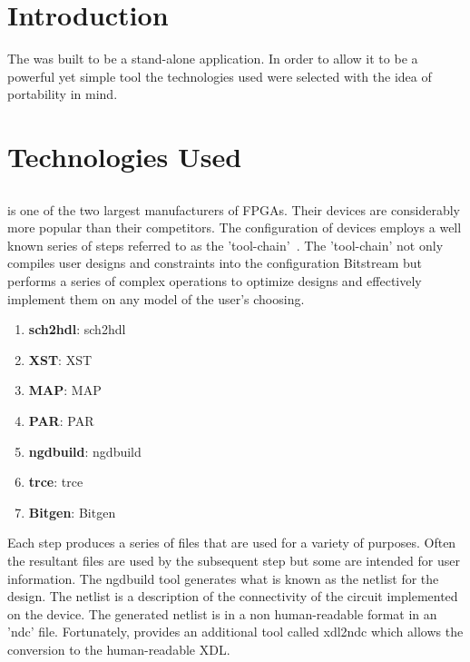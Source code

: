 \label{chapter:implementation}
\section{Introduction}
The \NameNoPeriod was built to be a stand-alone application.
In order to allow it to be a powerful yet simple tool the technologies used were selected with the idea of portability in mind.

\section{Technologies Used}
\subsection{\Xilinx}
\Xilinx is one of the two largest manufacturers of \acrshort{FPGA}s. 
Their devices are considerably more popular than their competitors.
The configuration of devices employs a well known series of steps referred to as the \Xilinx 'tool-chain'~\cite{xilnxDevManual}.
The 'tool-chain' not only compiles user designs and constraints into the configuration \gls{Bitstream} but performs a series of complex operations to optimize designs and effectively implement them on any \Xilinx model of the user's choosing.
\begin{enumerate}
	\item \textbf{\gls{sch2hdl}}: \glsdesc{sch2hdl}
	\item \textbf{\gls{XST}}: \glsdesc{XST}
	\item \textbf{\gls{MAP}}: \glsdesc{MAP}
	\item \textbf{\gls{PAR}}: \glsdesc{PAR}
	\item \textbf{\gls{ngdbuild}}: \glsdesc{ngdbuild}
	\item \textbf{\gls{trce}}: \glsdesc{trce}
	\item \textbf{\gls{Bitgen}}: \glsdesc{Bitgen}
\end{enumerate}
Each step produces a series of files that are used for a variety of purposes. 
Often the resultant files are used by the subsequent step but some are intended for user information.
The \gls{ngdbuild} tool generates what is known as the netlist for the design.
The netlist is a description of the connectivity of the circuit implemented on the device. 
The generated netlist is in a non human-readable format in an 'ndc' file.
Fortunately, \Xilinx provides an additional tool called \gls{xdl2ndc} which allows the conversion to the human-readable \acrfull{XDL}.
